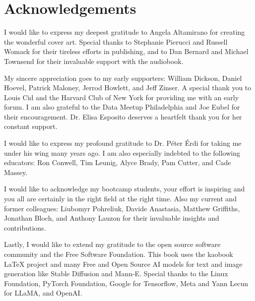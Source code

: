 \let\cleardoublepage\clearpage
\chapter*{Acknowledgements}

I would like to express my deepest gratitude to Angela Altamirano for creating the wonderful cover art. Special thanks to Stephanie Pierucci and Russell Womack for their tireless efforts in publishing, and to Dan Bernard and Michael Townsend for their invaluable support with the audiobook.

My sincere appreciation goes to my early supporters: William Dickson, Daniel Hoevel, Patrick Maloney, Jerrod Howlett, and Jeff Zinser. A special thank you to Louis Cid and the Harvard Club of New York for providing me with an early forum. I am also grateful to the Data Meetup Philadelphia and Joe Eubel for their encouragement. Dr. Elisa Esposito deserves a heartfelt thank you for her constant support.

I would like to express my profound gratitude to Dr. Péter Érdi for taking me under his wing many years ago. I am also especially indebted to the following educators: Ron Conwell, Tim Leunig, Alyce Brady, Pam Cutter, and Cade Massey.

I would like to acknowledge my bootcamp students, your effort is inspiring and you all are certainly in the right field at the right time. Also my current and former colleagues: Liubomyr Pohreliuk, Davide Anastasia, Matthew Griffiths, Jonathan Bloch, and Anthony Lauzon for their invaluable insights and contributions.

Lastly, I would like to extend my gratitude to the open source software community and the Free Software Foundation. This book uses the kaobook LaTeX project and many Free and Open Source AI models for text and image generation like Stable Diffusion and Mann-E. Special thanks to the Linux Foundation, PyTorch Foundation, Google for Tensorflow, Meta and Yann Lecun for LLaMA, and OpenAI.
